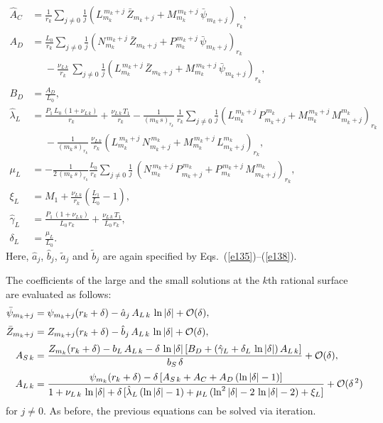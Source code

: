 \documentclass[12pt,prb,aps]{revtex4-1}
\begin{document}
\begin{align}
\hat{A}_{C} &= \frac{1}{r_k}\sum_{j\neq 0}\frac{1}{j}\left(L_{m_k}^{\,m_k+j}\,\bar{Z}_{m_k+j}+ M_{m_k}^{\,m_k+j}\,\bar{\psi}_{m_k+j}\right)_{r_k},\\[0.5ex]
A_{D} &=  \frac{L_0}{r_k}\sum_{j\neq 0}\frac{1}{j}\left(N_{m_k}^{\,m_k+j}\,\bar{Z}_{m_k+j}+ P_{m_k}^{\,m_k+j}\,\bar{\psi}_{m_k+j}\right)_{r_k}
\nonumber\\[0.5ex]&\phantom{=}-
\frac{\nu_{L\,k}}{r_k}\,\sum_{j\neq 0}\frac{1}{j}\left(L_{m_k}^{\,m_k+j}\,\bar{Z}_{m_k+j}+ M_{m_k}^{\,m_k+j}\,\bar{\psi}_{m_k+j}\right)_{r_k},
\\[0.5ex]
B_{D} &= \frac{A_{D}}{L_0},\\[0.5ex]
\hat{\lambda}_{L} &= \frac{P_1\,L_0\,(1+\nu_{L\,k}) }{r_k} + \frac{\nu_{L\,k}\,T_1}{r_k}
-\frac{1}{(m_k\,s)_{r_k}}\,\frac{1}{r_k}\sum_{j\neq 0}\frac{1}{j}\left(L_{m_k}^{\,m_k+j}\,P_{m_k+j}^{\,m_k}+M_{m_k}^{\,m_k+j}\,M_{m_k+j}^{m_k}\right)_{r_k}\nonumber\\[0.5ex]&\phantom{=}
- \frac{1}{(m_k\,s)_{r_k}}\,\frac{\nu_{L\,k}}{r_k}
\left(L_{m_k}^{\,m_k+j}\,N_{m_k+j}^{\,m_k}+M_{m_k}^{\,m_k+j}\,L_{m_k+j}^{m_k}\right)_{r_k},\\[0.5ex]
\mu_{L}&= -\frac{1}{2\,(m_k\,s)_{r_k}}\frac{L_0}{r_k}\sum_{j\neq 0}\frac{1}{j}\,(N_{m_k}^{\,m_k+j}\,P_{m_k+j}^{\,m_k}+P_{m_k}^{\,m_k+j}\,M_{m_k+j}^{\,m_k})_{r_k},\\[0.5ex]
\xi_{L} &= M_1+ \frac{\nu_{L\,k}}{r_k} \left(\frac{L_1}{L_0}-1\right),\\[0.5ex]
\hat{\gamma}_{L} &=\frac{P_1\,(1+\nu_{L\,k})}{L_0\,r_k} + \frac{\nu_{L\,k}\,T_1}{L_0\,r_k},\\[0.5ex]
\delta_{L} &= \frac{\mu_{L}}{L_0}.
\end{align}
Here, $\hat{a}_j$, $\hat{b}_j$, $\tilde{a}_j$ and $\tilde{b}_j$ are again specified by Eqs.~(\ref{e135})--(\ref{e138}). 

The coefficients of the large and the small solutions at the $k$th rational surface are evaluated as follows:
\begin{align}
\bar{\psi}_{m_k+j} &= \psi_{m_k+j}(r_k+\delta)- \hat{a}_j\,A_{L\,k}\,\ln|\delta| +{\cal O}(\delta),\\[0.5ex]
\bar{Z}_{m_k+j}&= Z_{m_k+j}(r_k+\delta)-\hat{b}_j\,A_{L\,k}\,\ln|\delta|+{\cal O}(\delta),\\[0.5ex]
A_{S\,k} &= \frac{Z_{m_k}(r_k+\delta)-b_{L}\,A_{L\,k}-\delta\,\ln|\delta|\,[B_D+(\hat{\gamma}_L+\delta_L\,\ln|\delta|)\,A_{L\,k}]}
{b_S\,\delta}+{\cal O}(\delta),\\[0.5ex]
A_{L\,k} &= \frac{\psi_{m_k}(r_k+\delta)-\delta\,[A_{S\,k}+A_C+A_D\,(\ln|\delta|-1)]}
{1+\nu_{L\,k}\,\ln|\delta|+\delta\,[\hat{\lambda}_L\,(\ln|\delta|-1)+ \mu_L\,(\ln^2|\delta|-2\,\ln|\delta|-2)+\xi_L]}+{\cal O}(\delta^{\,2})
\end{align}
for $j\neq 0$. As before, the previous equations can be solved via iteration.
\end{document}
